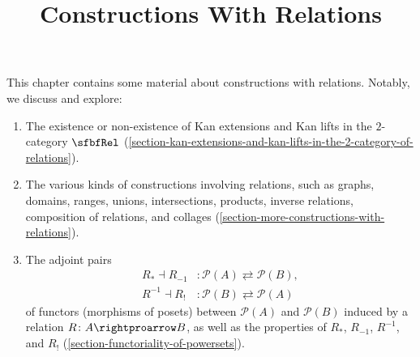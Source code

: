 

%



\title{Constructions With Relations}

\maketitle

\label{section-phantom}

This chapter contains some material about constructions with relations. Notably, we discuss and explore:
\begin{enumerate}
    \item The existence or non-existence of Kan extensions and Kan lifts in the $2$-category $\sfbfRel$ (\cref{section-kan-extensions-and-kan-lifts-in-the-2-category-of-relations}).
    \item The various kinds of constructions involving relations, such as graphs, domains, ranges, unions, intersections, products, inverse relations, composition of relations, and collages (\cref{section-more-constructions-with-relations}).
    \item The adjoint pairs
        \begin{align*}
            R_{*}  \dashv R_{-1} &\colon \mathcal{P}(A) \rightleftarrows \mathcal{P}(B),\\
            R^{-1} \dashv R_{!}  &\colon \mathcal{P}(B) \rightleftarrows \mathcal{P}(A)
        \end{align*}
        of functors (morphisms of posets) between $\mathcal{P}(A)$ and $\mathcal{P}(B)$ induced by a relation $R\colon A\rightproarrow B$, as well as the properties of $R_{*}$, $R_{-1}$, $R^{-1}$, and $R_{!}$ (\cref{section-functoriality-of-powersets}).


\end{enumerate}
